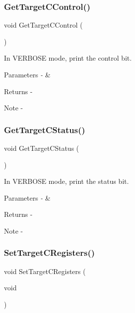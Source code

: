 \subsubsection{GetTargetCControl()}
{\footnotesize\ttfamily void Get\+Target\+C\+Control (\begin{DoxyParamCaption}{ }\end{DoxyParamCaption})}



In V\+E\+R\+B\+O\+SE mode, print the control bit. 


\begin{DoxyParams}{Parameters}
{\em -\/} & \\
\hline
\end{DoxyParams}
\begin{DoxyReturn}{Returns}
-\/
\end{DoxyReturn}
\begin{DoxyNote}{Note}
-\/ 
\end{DoxyNote}
\mbox{\label{_t_a_r_g_e_t_c___register_map_8c_a0d2306afc10a029a7860a9397c4a168d}} 
\subsubsection{GetTargetCStatus()}
{\footnotesize\ttfamily void Get\+Target\+C\+Status (\begin{DoxyParamCaption}{ }\end{DoxyParamCaption})}



In V\+E\+R\+B\+O\+SE mode, print the status bit. 


\begin{DoxyParams}{Parameters}
{\em -\/} & \\
\hline
\end{DoxyParams}
\begin{DoxyReturn}{Returns}
-\/
\end{DoxyReturn}
\begin{DoxyNote}{Note}
-\/ 
\end{DoxyNote}
\mbox{\label{_t_a_r_g_e_t_c___register_map_8c_a75c207718aac25b039f539a717bedf1c}} 
\subsubsection{SetTargetCRegisters()}
{\footnotesize\ttfamily void Set\+Target\+C\+Registers (\begin{DoxyParamCaption}\item[{void}]{ }\end{DoxyParamCaption})}



